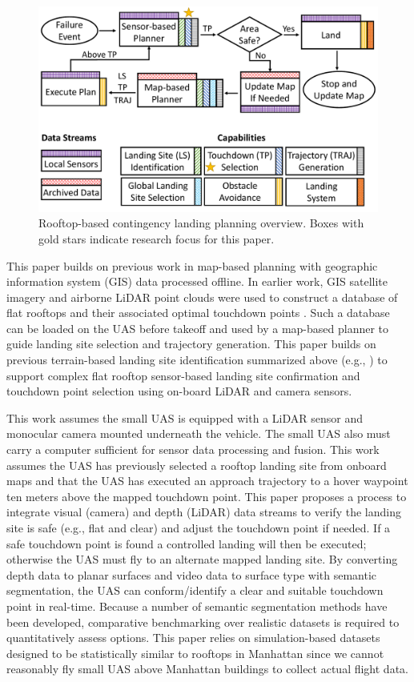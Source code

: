 \begin{figure}[ht!]
\centering
\includegraphics[width=.85\linewidth]{chapter_6_landingsim/figs/problem_statement_overview_2.pdf}
\caption[Rooftop-based contingency landing planning overview]{Rooftop-based contingency landing planning overview. Boxes with gold stars indicate research focus for this paper. }
\label{fig:ch6_contingency_planning}
\end{figure}

This paper builds on previous work in map-based planning with geographic information system (GIS) data processed offline. In earlier work, GIS satellite imagery and airborne LiDAR point clouds were used to construct a database of flat rooftops and their associated optimal touchdown points  \cite{castagno_map-based_2021}. Such a database can be loaded on the UAS before takeoff and used by a map-based planner to guide landing site selection and trajectory generation. This paper builds on previous terrain-based landing site identification summarized above (e.g., \cite{scherer_autonomous_2012}) to support complex flat rooftop sensor-based landing site confirmation and touchdown point selection using on-board LiDAR and camera sensors.

This work assumes the small UAS is equipped with a LiDAR sensor and monocular camera mounted underneath the vehicle. The small UAS also must carry a computer sufficient for sensor data processing and fusion. This work assumes the UAS has previously selected a rooftop landing site from onboard maps and that the UAS has executed an approach trajectory to a hover waypoint ten meters above the mapped touchdown point. This paper proposes a process to integrate visual (camera) and depth (LiDAR) data streams to verify the landing site is safe (e.g., flat and clear) and adjust the touchdown point if needed. If a safe touchdown point is found a controlled landing will then be executed; otherwise the UAS must fly to an alternate mapped landing site.  By converting depth data to planar surfaces and video data to surface type with semantic segmentation, the UAS can conform/identify a clear and suitable touchdown point in real-time. Because a number of semantic segmentation methods have been developed, comparative benchmarking over realistic datasets is required to quantitatively assess options.  This paper relies on simulation-based datasets designed to be statistically similar to rooftops in Manhattan since we cannot reasonably fly small UAS above Manhattan buildings to collect actual flight data.

